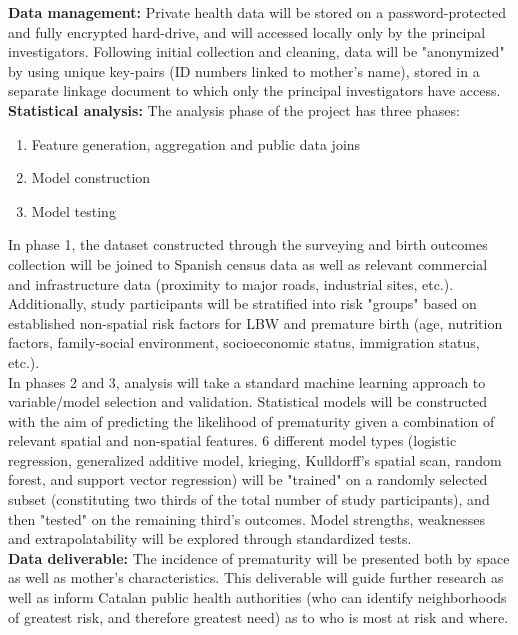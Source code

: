 \documentclass{article}
\begin{document}
\begin{multicols}{2}
\noindent \textbf{Data management:} Private health data will be stored on a password-protected and fully encrypted hard-drive, and will accessed locally only by the principal investigators.  Following initial collection and cleaning, data will be "anonymized" by using unique key-pairs (ID numbers linked to mother's name), stored in a separate linkage document to which only the principal investigators have access. \\ 

\noindent \textbf{Statistical analysis:} The analysis phase of the project has three phases: \begin{enumerate}
\item Feature generation, aggregation and public data joins
\item Model construction 
\item Model testing
\end{enumerate}

In phase 1, the dataset constructed through the surveying and birth outcomes collection will be joined to Spanish census data as well as relevant commercial and infrastructure data (proximity to major roads, industrial sites, etc.). Additionally, study participants will be stratified into risk "groups" based on established non-spatial risk factors for LBW and premature birth (age, nutrition factors, family-social environment, socioeconomic status, immigration status, etc.). \\

In phases 2 and 3, analysis will take a standard machine learning approach to variable/model selection and validation.  Statistical models will be constructed with the aim of predicting the likelihood of prematurity given a combination of relevant spatial and non-spatial features.  6 different model types (logistic regression, generalized additive model, krieging, Kulldorff's spatial scan, random forest, and support vector regression) will be "trained" on a randomly selected subset (constituting two thirds of the total number of study participants), and then "tested" on the remaining third's outcomes.  Model strengths, weaknesses and extrapolatability will be explored through standardized tests. \\

\noindent \textbf{Data deliverable:} The incidence of prematurity will be presented both by space as well as mother's characteristics.  This deliverable will guide further research as well as inform Catalan public health authorities (who can identify neighborhoods of greatest risk, and therefore greatest need) as to who is most at risk and where. \\


\end{multicols}
\end{document}
